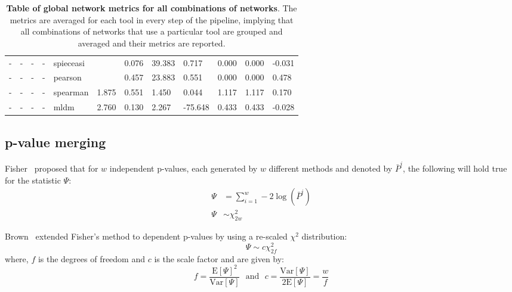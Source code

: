 \begin{table}[]
\begin{tabular}{|l|l|l|l|l|l|l|l|l|l|l|l|}
  -  & -             & -                 & -           & spieceasi  &                              & 0.076              & 39.383                      & 0.717      & 0.000             & 0.000             & -0.031                           \\
  -  & -             & -                 & -           & pearson    &                              & 0.457              & 23.883                      & 0.551      & 0.000             & 0.000             & 0.478                            \\
  -  & -             & -                 & -           & spearman   & 1.875                        & 0.551              & 1.450                       & 0.044      & 1.117             & 1.117             & 0.170                            \\
  -  & -             & -                 & -           & mldm       & 2.760                        & 0.130              & 2.267                       & -75.648    & 0.433             & 0.433             & -0.028                           \\ \hline
  \end{tabular}
  \caption{
    \textbf{Table of global network metrics for all combinations of networks}.
    The metrics are averaged for each tool in every step of the pipeline, implying that all combinations of networks that use a particular tool are grouped and averaged and their metrics are reported.
  }
  \label{tab:network_metrics}
  \end{table}


  \subsection*{p-value merging}

  Fisher~\cite{fisher_224a_1948} proposed that for $w$ independent p-values, each generated by $w$ different methods and denoted by $\bar{P}^i$, the following will hold true for the statistic $\Psi$:
  \begin{equation*}
    \begin{aligned}
      \Psi &= \sum_{i=1}^w -2 \log \left( \bar{P}^i \right) \\
        \Psi &\sim \chi^2_{2w}
    \end{aligned}
  \end{equation*}

  Brown~\cite{brown_400_1975} extended Fisher's method to dependent p-values by using a re-scaled $\chi^2$ distribution:
  \begin{equation*}
    \Psi \sim c \chi^2_{2f}
  \end{equation*}
  where, $f$ is the degrees of freedom and $c$ is the scale factor and are given by:
  \begin{equation*}
    f = \frac{\mathrm{E}[\Psi]^2}{\mathrm{Var}[\Psi]} ~~~\text{and}~~~ c = \frac{\mathrm{Var}[\Psi]}{2\mathrm{E}[\Psi]} = \frac{w}{f}
  \end{equation*}

